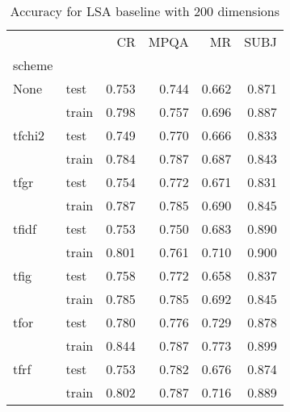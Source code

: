 \begin{table}[h]
\begin{center}

\begin{tabular}{llrrrr}
\toprule
{} &      &  CR &  MPQA &  MR &  SUBJ \\
scheme &  &            &              &            &              \\
\midrule
None & test &      0.753 &        0.744 &      0.662 &        0.871 \\
{} & train &      0.798 &        0.757 &      0.696 &        0.887 \\
tfchi2 & test &      0.749 &        0.770 &      0.666 &        0.833 \\
{} & train &      0.784 &        0.787 &      0.687 &        0.843 \\
tfgr & test &      0.754 &        0.772 &      0.671 &        0.831 \\
{} & train &      0.787 &        0.785 &      0.690 &        0.845 \\
tfidf & test &      0.753 &        0.750 &      0.683 &        0.890 \\
{} & train &      0.801 &        0.761 &      0.710 &        0.900 \\
tfig & test &      0.758 &        0.772 &      0.658 &        0.837 \\
{} & train &      0.785 &        0.785 &      0.692 &        0.845 \\
tfor & test &      0.780 &        0.776 &      0.729 &        0.878 \\
{} & train &      0.844 &        0.787 &      0.773 &        0.899 \\
tfrf & test &      0.753 &        0.782 &      0.676 &        0.874 \\
{} & train &      0.802 &        0.787 &      0.716 &        0.889 \\
\bottomrule
\end{tabular}

\caption[Accuracy for LSA baseline with 200 dimensions]{Accuracy for LSA baseline with 200 dimensions}
\label{tab:lsa:resuts:abs:200}
\end{center}
\end{table}





